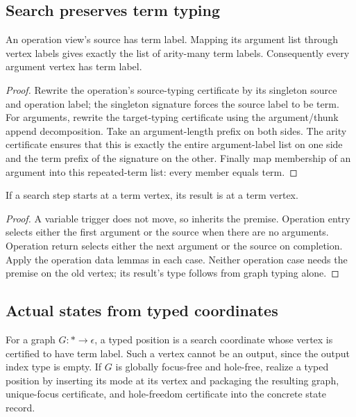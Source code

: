 \subsection{Search preserves term typing}
\begin{lemma}
An operation view's source has term label. Mapping its argument list through
vertex labels gives exactly the list of arity-many term labels. Consequently
every argument vertex has term label.
\end{lemma}
\begin{proof}
Rewrite the operation's source-typing certificate by its singleton source and
operation label; the singleton signature forces the source label to be term.
For arguments, rewrite the target-typing certificate using the argument/thunk
append decomposition. Take an argument-length prefix on both sides. The
arity certificate ensures that this is exactly the entire argument-label list
on one side and the term prefix of the signature on the other. Finally map
membership of an argument into this repeated-term list: every member equals
term.
\end{proof}

\begin{theorem}
If a search step starts at a term vertex, its result is at a term vertex.
\end{theorem}
\begin{proof}
A variable trigger does not move, so inherits the premise. Operation entry
selects either the first argument or the source when there are no arguments.
Operation return selects either the next argument or the source on completion.
Apply the operation data lemmas in each case. Neither operation case needs the
premise on the old vertex; its result's type follows from graph typing alone.
\end{proof}

\subsection{Actual states from typed coordinates}
\begin{definition}\label{term:typed-position}
For a graph $G:*\to\epsilon$, a typed position is a search coordinate whose
vertex is certified to have term label. Such a vertex cannot be an output,
since the output index type is empty. If $G$ is globally focus-free and
hole-free, realize a typed position by inserting its mode at its vertex and
packaging the resulting graph, unique-focus certificate, and hole-freedom
certificate into the concrete state record.
\end{definition}

